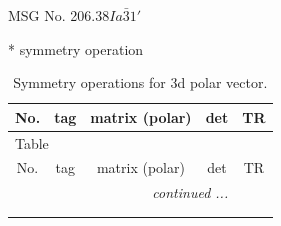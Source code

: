 \documentclass[fleqn,8pt]{jsarticle}
\begin{document}
\setcounter{MaxMatrixCols}{32}

\renewcommand{\tablename}{Table~}
\renewcommand{\figurename}{Figure~}
\begin{center}
\LARGE
MSG No. 206.38\quad$Ia\bar{3}1'$
\end{center}
* symmetry operation
\renewcommand{\arraystretch}{1.3}
\begin{longtable}{ccccc}
\caption{Symmetry operations for 3d polar vector.}
 \\
 \hline \hline
No. & tag & matrix (polar) & det & TR \\ \hline \endfirsthead

\multicolumn{4}{l}{\tablename\ \thetable{}} \\
 \hline \hline
No. & tag & matrix (polar) & det & TR \\ \hline \endhead

 \hline \hline
\multicolumn{4}{r}{\footnotesize\it continued ...} \\ \endfoot

 \hline \hline
\multicolumn{4}{r}{} \\ \endlastfoot


\end{longtable}
\end{document}

